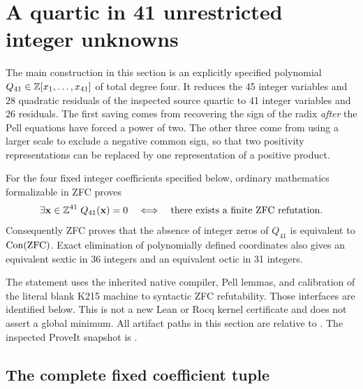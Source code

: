 \section{A quartic in 41 unrestricted integer unknowns}

The main construction in this section is an explicitly specified polynomial
\(Q_{41}\in\mathbb Z[x_1,\ldots,x_{41}]\) of total degree four.  It reduces the
45 integer variables and 28 quadratic residuals of the inspected source
quartic to 41 integer variables and 26 residuals.  The first saving comes
from recovering the sign of the radix \emph{after} the Pell equations have
forced a power of two.  The other three come from using a larger scale to
exclude a negative common sign, so that two positivity representations can
be replaced by one representation of a positive product.

\begin{theorem}
For the four fixed integer coefficients specified below, ordinary
mathematics formalizable in ZFC proves
\[
 \exists\mathbf x\in\mathbb Z^{41}\;Q_{41}(\mathbf x)=0
 \quad\Longleftrightarrow\quad
 \text{there exists a finite ZFC refutation}.
\]
Consequently ZFC proves that the absence of integer zeros of \(Q_{41}\) is
equivalent to \(\operatorname{Con}(\mathrm{ZFC})\).  Exact elimination of polynomially
defined coordinates also gives an equivalent sextic in 36 integers and an
equivalent octic in 31 integers.
\end{theorem}

The statement uses the inherited native compiler, Pell lemmas, and
calibration of the literal blank K215 machine to syntactic ZFC
refutability.  Those interfaces are identified below.  This is not a new
Lean or Rocq kernel certificate and does not assert a global minimum.
All artifact paths in this section are relative to
.  The inspected ProveIt snapshot is
.

\subsection{The complete fixed coefficient tuple}

